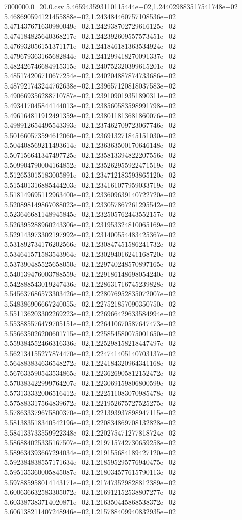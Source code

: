 \begin{filecontents*}{7000000.0_20.0.csv}
5.465943593110115444e+02,1.244029883517541748e+02
5.468690594121455888e+02,1.243484460757108536e+02
5.471437671630980049e+02,1.242938702729616125e+02
5.474184825640368217e+02,1.242392609557573451e+02
5.476932056151371171e+02,1.241846181363534924e+02
5.479679363165682844e+02,1.241299418270091337e+02
5.482426746684915315e+02,1.240752320399615201e+02
5.485174206710677254e+02,1.240204887874733686e+02
5.487921743244762638e+02,1.239657120818037583e+02
5.490669356288710787e+02,1.239109019351890311e+02
5.493417045844144013e+02,1.238560583598991798e+02
5.496164811912491359e+02,1.238011813681860076e+02
5.498912654495543393e+02,1.237462709723067746e+02
5.501660573594612060e+02,1.236913271845151030e+02
5.504408569211493614e+02,1.236363500170646148e+02
5.507156641347497725e+02,1.235813394822207556e+02
5.509904790004164852e+02,1.235262955922471519e+02
5.512653015183005891e+02,1.234712183593865120e+02
5.515401316885444203e+02,1.234161077959033719e+02
5.518149695112963400e+02,1.233609639140722720e+02
5.520898149867088023e+02,1.233057867261295542e+02
5.523646681148945845e+02,1.232505762443552157e+02
5.526395288960243306e+02,1.231953324810065169e+02
5.529143973302197992e+02,1.231400554483425367e+02
5.531892734176202566e+02,1.230847451586241732e+02
5.534641571583543964e+02,1.230294016241168720e+02
5.537390485525658050e+02,1.229740248570897165e+02
5.540139476003788559e+02,1.229186148698054240e+02
5.542888543019247436e+02,1.228631716745239828e+02
5.545637686573303426e+02,1.228076952835072007e+02
5.548386906667240055e+02,1.227521857090350750e+02
5.551136203302269223e+02,1.226966429633584994e+02
5.553885576479705151e+02,1.226410670587647473e+02
5.556635026200601715e+02,1.225854580075001650e+02
5.559384552466316336e+02,1.225298158218447497e+02
5.562134155277874470e+02,1.224741405140703137e+02
5.564883834636548272e+02,1.224184320964341168e+02
5.567633590543534865e+02,1.223626905812152472e+02
5.570383422999764207e+02,1.223069159806800599e+02
5.573133332006516412e+02,1.222511083070985478e+02
5.575883317564839672e+02,1.221952675727525275e+02
5.578633379675800370e+02,1.221393937898947115e+02
5.581383518340542196e+02,1.220834869708132828e+02
5.584133733559922348e+02,1.220275471277818724e+02
5.586884025335167507e+02,1.219715742730659258e+02
5.589634393667294034e+02,1.219155684189427120e+02
5.592384838557171634e+02,1.218595295776940475e+02
5.595135360005845087e+02,1.218034577615790113e+02
5.597885958014143171e+02,1.217473529828812389e+02
5.600636632583305072e+02,1.216912152538807277e+02
5.603387383714020871e+02,1.216350445868538372e+02
5.606138211407248946e+02,1.215788409940832935e+02

\end{filecontents*}
